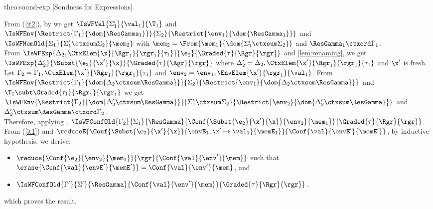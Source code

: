 \begin{proofOf}{theo:sound-exp} [Sondness for Expressions]
\begin{description}
%
From (\ref{it2}), by  we get  $\IsWFVal{\Sigma'_1}{\val_1}{\T_1}$ and
$\IsWFEnv{\Restrict{{\Gamma_1}}{\dom{\ResGamma_1}}}{\Sigma_2}{\Restrict{{\env_1}}{\dom{\ResGamma_1}}}$ and 
$\IsWFMemOld{\Sigma_1}{\Sigma'_1\ctxsum\Sigma_2}{\mem_2}$ with $\mem_2=\From{{\mem_1}}{\dom{\Sigma'_1\ctxsum\Sigma_2}}$
and $\ResGamma_1\ctxord\Gamma_1$.\\
%
From  $\IsWFExp{\Delta_2,\CtxElem{\x}{\Rgr_1}{\rgr_1}{\tau_1}}{\e_2}{\Graded{\tau}{\Rgr}{\rgr}}$ and \cref{lem:renaming}, we get  $\IsWFExp{\Delta'_2}{\Subst{\e_2}{\x'}{\x}}{\Graded{\tau}{\Rgr}{\rgr}}$ where 
$\Delta'_2=\Delta_2,\CtxElem{\x'}{\Rgr_1}{\rgr_1}{\tau_1}$ and $\x'$ is fresh.\\
%
%
Let $\Gamma_2=\Gamma_1,\CtxElem{\x'}{\Rgr_1}{\rgr_1}{\tau_1}$ and $\env_2=\env_1,\EnvElem{\x'}{\rgr_1}{\val_1}$. From $\IsWFEnv{\Restrict{{\Gamma_1}}{\dom{\Delta_2\ctxsum\ResGamma}}}{\Sigma_2}{\Restrict{{\env_1}}{\dom{\Delta_2\ctxsum\ResGamma}}}$ and $\T_1\subt\Graded{\tau_1}{\Rgr_1}{\rgr_1}$ we get  $\IsWFEnv{\Restrict{{\Gamma_2}}{\dom{\Delta'_2\ctxsum\ResGamma}}}{\Sigma'_1\ctxsum\Sigma_2}{\Restrict{{\env_2}}{\dom{\Delta'_2\ctxsum\ResGamma}}}$ and $\Delta'_2\ctxsum\ResGamma\ctxord\Gamma_2$.\\
%
Therefore, applying , $\IsWFConfOld{\Gamma_2}{\Sigma_1}{\ResGamma}{\Conf{\Subst{\e_2}{\x'}{\x}}{\env_2}{\mem_1}}{\Graded{\tau}{\Rgr}{\rgr}}$. \\
%
From (\ref{it1}) and $\reduceE{{\Conf{\Subst{\e_2}{\x'}{\x}}{{\envE_1},\x'\mapsto\val_1}{\memE_1}}}{{\Conf{\val}{\envE'}{\memE'}}}$, by inductive hypothesis, we derive:
\begin{itemize}
\item \label{it1} $\reduce{\Conf{\e_2}{\env_2}{\mem_1}}{\rgr}{\Conf{\val}{\env'}{\mem}}$ such that $\erase{\Conf{\val}{\envE'}{\memE'}}=\Conf{\val}{\env'}{\mem}$, and 
\item \label{it2} $\IsWFConfOld{\Gamma'}{\Sigma'}{\ResGamma}{\Conf{\val}{\env'}{\mem}}{\Graded{\tau}{\Rgr}{\rgr}}$. %
\end{itemize}
which  proves the result.

\bigskip
{}


\item [Case $\e={\FieldAccess{\x}{\f_k}}$]\ 


\end{description}
\end{proofOf}
